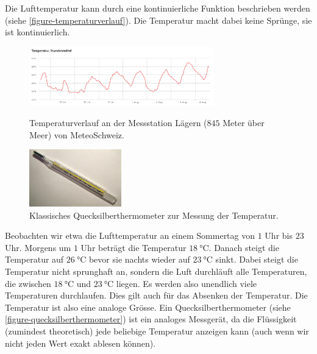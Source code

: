 \begin{example}
Die Lufttemperatur kann durch eine kontinuierliche Funktion beschrieben werden (siehe \autoref{figure-temperaturverlauf}). Die Temperatur macht dabei keine Sprünge, sie ist kontinuierlich. 

\begin{figure}[htb]
\centering
\begin{minipage}{0.6\textwidth}
\centering
\includegraphics[width=8cm]{temperaturverlauf.png}
\caption{Temperaturverlauf an der Messstation Lägern ($845$ Meter über Meer) von MeteoSchweiz.}
\label{figure-temperaturverlauf}
\end{minipage}
\hfill
\begin{minipage}{0.3\textwidth}
\centering
\includegraphics[width=4cm]{qucksilberthermometer.jpg}
\caption{Klassisches Quecksilberthermometer zur Messung der Temperatur.}
\label{figure-quecksilberthermometer}
\end{minipage}
\end{figure}

Beobachten wir etwa die Lufttemperatur an einem Sommertag von $1$ Uhr bis $23$ Uhr. Morgens um $1$ Uhr beträgt die Temperatur $\qty{18}{\degreeCelsius}$. Danach steigt die Temperatur auf $\qty{26}{\degreeCelsius}$ bevor sie nachts wieder auf $\qty{23}{\degreeCelsius}$ sinkt. Dabei steigt die Temperatur nicht sprunghaft an, sondern die Luft durchläuft alle Temperaturen, die zwischen $\qty{18}{\degreeCelsius}$ und $\qty{23}{\degreeCelsius}$ liegen. Es werden also unendlich viele Temperaturen durchlaufen. Dies gilt auch für das Absenken der Temperatur. Die Temperatur ist also eine analoge Grösse. Ein Quecksilberthermometer (siehe \autoref{figure-quecksilberthermometer}) ist ein analoges Messgerät, da die Flüssigkeit (zumindest theoretisch) jede beliebige Temperatur anzeigen kann (auch wenn wir nicht jeden Wert exakt ablesen können).

\end{example}

